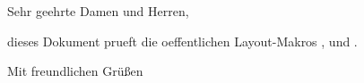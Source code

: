 \documentclass[infoblock, lang=german]{../../onlinebrief24}
\begin{document}
\begin{letter}{}
\opening{Sehr geehrte Damen und Herren,}

dieses Dokument prueft die oeffentlichen Layout-Makros
\texttt{\string\setinfoblocktopoffset},
\texttt{\string\setinfoblockrightedge} und
\texttt{\string\setinfoblockcolwidths}.

\closing{Mit freundlichen Gr\"u\ss{}en}
\end{letter}
\end{document}

